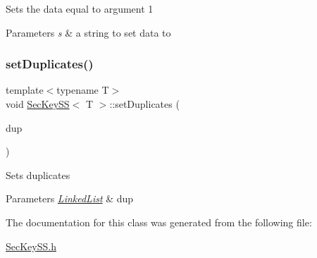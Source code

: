 Sets the data equal to argument 1 
\begin{DoxyParams}{Parameters}
{\em s} & a string to set data to \\
\hline
\end{DoxyParams}
\mbox{\label{classSecKeySS_a95fdde8fc0b590359692784d15481dd4}} 
\subsubsection{\texorpdfstring{set\+Duplicates()}{setDuplicates()}}
{\footnotesize\ttfamily template$<$typename T$>$ \\
void \hyperlink{classSecKeySS}{Sec\+Key\+SS}$<$ T $>$\+::set\+Duplicates (\begin{DoxyParamCaption}\item[{\hyperlink{classLinkedList}{Linked\+List}$<$ T $>$}]{dup }\end{DoxyParamCaption})}

Sets duplicates 
\begin{DoxyParams}{Parameters}
{\em \hyperlink{classLinkedList}{Linked\+List}} & dup \\
\hline
\end{DoxyParams}


The documentation for this class was generated from the following file\+:\begin{DoxyCompactItemize}
\item 
\hyperlink{SecKeySS_8h}{Sec\+Key\+S\+S.\+h}\end{DoxyCompactItemize}
